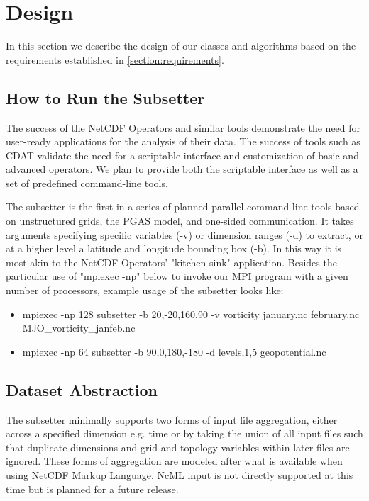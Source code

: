 \section{Design}
\label{section:design}

In this section we describe the design of our classes and algorithms based on
the requirements established in \ref{section:requirements}.

\subsection{How to Run the Subsetter}

The success of the NetCDF Operators\cite{NCO} and similar tools demonstrate
the need for user-ready applications for the analysis of their data.  The
success of tools such as CDAT\cite{CDAT} validate the need for a scriptable
interface and customization of basic and advanced operators.  We plan to
provide both the scriptable interface as well as a set of predefined
command-line tools.

The subsetter is the first in a series of planned parallel command-line tools
based on unstructured grids, the PGAS model, and one-sided communication.  It
takes arguments specifying specific variables (-v) or dimension ranges (-d) to
extract, or at a higher level a latitude and longitude bounding box (-b).  In
this way it is most akin to the NetCDF Operators' "kitchen sink" application.
Besides the particular use of "mpiexec -np" below to invoke our MPI program
with a given number of processors, example usage of the subsetter looks like:

\begin{itemize}
\item mpiexec -np 128 subsetter -b 20,-20,160,90 -v vorticity january.nc february.nc MJO\_vorticity\_janfeb.nc
\item mpiexec -np 64 subsetter -b 90,0,180,-180 -d levels,1,5 geopotential.nc
\end{itemize}

\subsection{Dataset Abstraction}

The subsetter minimally supports two forms of input file aggregation, either
across a specified dimension e.g. time or by taking the union of all input
files such that duplicate dimensions and grid and topology variables within
later files are ignored.  These forms of aggregation are modeled after what is
available when using NetCDF Markup Language\cite{NcML}.  NcML input is not
directly supported at this time but is planned for a future release. 

